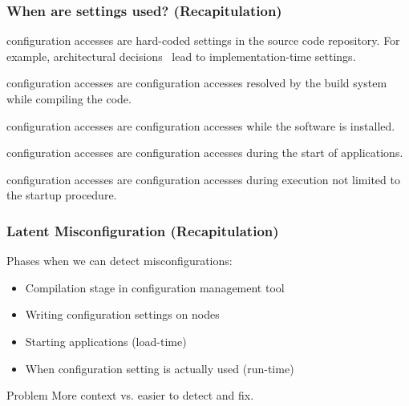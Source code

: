 \begin{frame}
	\frametitle{When are settings used? (Recapitulation)}

	\pause

	\begin{description}[<+-| alert@+>]
	\item[Implementation-time] configuration accesses 
	are hard-coded settings in the sou\-rce code repository.
	For example, architectural decisions~\cite{zdun2007patterns} lead to impl\-ementation-time settings.

	\item[Compile-time] configuration accesses 
	are configuration accesses resolved by the build system while compiling the code.

	\item[Deployment-time] configuration accesses 
	are configuration accesses while the software is installed.

	\item[Load-time] configuration accesses 
	are configuration accesses during the start of applications.

	\item[Run-time] configuration accesses 
	are configuration accesses during execution not limited to the startup procedure.
	\end{description}
\end{frame}

\begin{frame}
	\frametitle{Latent Misconfiguration (Recapitulation)}
	Phases when we can detect misconfigurations:
	\begin{itemize}[<+-| alert@+>]
	\item Compilation stage in configuration management tool
	\item Writing configuration settings on nodes
	\item Starting applications (load-time)
	\item When configuration setting is actually used (run-time)
	\end{itemize}

	\pause[\thebeamerpauses]

	\begin{alertblock}{Problem}
	More context vs. easier to detect and fix.
	\end{alertblock}
\end{frame}














